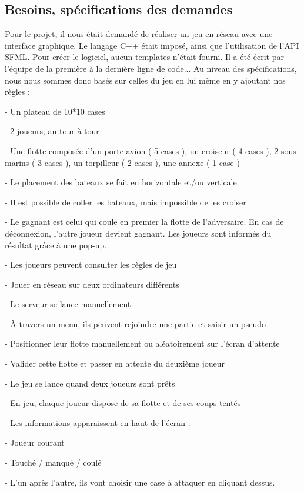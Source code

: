 \documentclass[a4paper,oneside]{article}
\begin{document}
\subsection{Besoins, spécifications des demandes}


Pour le projet, il nous était demandé de réaliser un jeu en réseau avec une interface graphique. Le langage C++ était imposé, ainsi que l'utilisation de l'API SFML.
Pour créer le logiciel, aucun templates n'était fourni. Il a été écrit par l'équipe de la première à la dernière ligne de code...
Au niveau des spécifications, nous nous sommes donc basés sur celles du jeu en lui même en y ajoutant nos règles :


	- Un plateau de 10*10 cases


	- 2 joueurs, au tour à tour


	- Une flotte composée d'un porte avion ( 5 cases ), un croiseur ( 4 cases ), 2 sous-marins ( 3 cases ), un torpilleur ( 2 cases ), une annexe ( 1 case )


	- Le placement des bateaux se fait en horizontale et/ou verticale


	- Il est possible de coller les bateaux, mais impossible de les croiser


	- Le gagnant est celui qui coule en premier la flotte de l'adversaire. En cas de déconnexion, l'autre joueur devient gagnant. 
	Les joueurs sont informés du résultat grâce à une pop-up.

	- Les joueurs peuvent consulter les règles de jeu


	- Jouer en réseau sur deux ordinateurs différents


	- Le serveur se lance manuellement


	- À travers un menu, ils peuvent rejoindre une partie et saisir un pseudo


	- Positionner leur flotte manuellement ou aléatoirement sur l'écran d'attente


	- Valider cette flotte et passer en attente du deuxième joueur


	- Le jeu se lance quand deux joueurs sont prêts


	- En jeu, chaque joueur dispose de sa flotte et de ses coups tentés


	- Les informations apparaissent en haut de l'écran :

		- Joueur courant

		- Touché / manqué / coulé


	- L'un après l'autre, ils vont choisir une case à attaquer en cliquant dessus.
	
\end{document}
